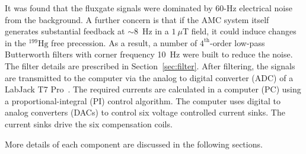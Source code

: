 

It was found that the fluxgate signals were dominated by 60-Hz electrical noise from the background. A further concern is that if the AMC system itself generates substantial feedback at $\sim8$~Hz in a $1~\mu$T field, it could induce changes in the $\mathrm{^{199}Hg}$ free precession. As a result, a number of $\mathrm{4^{th}}$-order low-pass Butterworth filters with corner frequency 10~Hz were built to reduce the noise. The filter details are prescribed in Section~\ref{sec:filter}. After filtering, the signals are transmitted to the computer via the analog to digital converter (ADC) of a LabJack T7 Pro~\cite{T7}. The required currents are calculated in a computer (PC) using a proportional-integral (PI) control algorithm. The computer uses digital to analog converters (DACs) to control six voltage controlled current sinks. The current sinks drive the six compensation coils.

More details of each component are discussed in the following sections.

